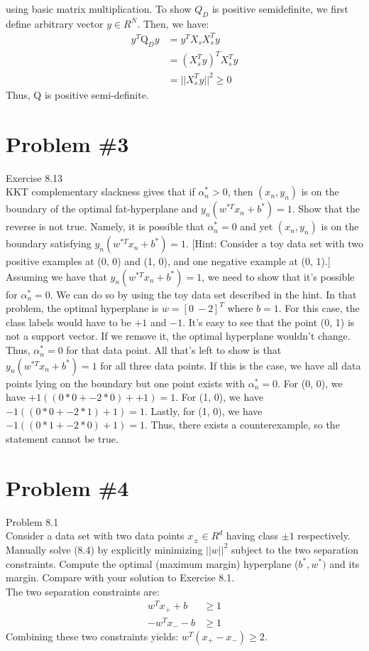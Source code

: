 \documentclass[12pt]{article}
\begin{document}
	using basic matrix multiplication.
	To show $Q_D$ is positive semidefinite, we first define arbitrary vector $y \in R^N$. Then, we have:
	\begin{align*}
		y^T \text{Q}_D y &= y^T X_sX_s^Ty \\
		&= (X_s^Ty)^T X_s^Ty\\
		&= ||X_s^Ty||^2 \ge 0
	\end{align*}
	Thus, Q is positive semi-definite.
	\section*{Problem \#3}
	Exercise 8.13 \\
	KKT complementary slackness gives that if $\alpha_n^* > 0$, then $(x_n , y_n)$ is on
	the boundary of the optimal fat-hyperplane and $y_n (w^{*T} x_n + b^{*} ) = 1$.
	Show that the reverse is not true. Namely, it is possible that $\alpha_n^* = 0$ and
	yet $(x_n , y_n)$ is on the boundary satisfying $y_n (w^{*T} x_n + b^{*} ) = 1$.
	[Hint: Consider a toy data set with two positive examples at (0, 0) and
	(1, 0), and one negative example at (0, 1).] \\
	Assuming we have that $y_n (w^{*T} x_n + b^{*} ) = 1$, we need to show that it's possible for $\alpha_n^* = 0$. We can do so by using the toy data set described in the hint. In that problem, the optimal hyperplane is $w = [0 \ -2]^T$ where $b=1$. For this case, the class labels would have to be $+1$ and $-1$. It's easy to see that the point (0, 1) is not a support vector. If we remove it, the optimal hyperplane wouldn't change. Thus, $\alpha_n^* = 0$ for that data point. All that's left to show is that $y_n (w^{*T} x_n + b^{*} ) = 1$ for all three data points. If this is the case, we have all data points lying on the boundary but one point exists with $\alpha_n^* = 0$. For (0, 0), we have $+1 ((0*0 + -2*0) + +1)=1$. For (1, 0), we have $-1 ((0*0 + -2*1) + 1)=1$. Lastly, for (1, 0), we have $-1 ((0*1 + -2*0) + 1)=1$. Thus, there exists a counterexample, so the statement cannot be true.
	\section*{Problem \#4}
	Problem 8.1 \\
	Consider a data set with two data points $x_{\pm} \in R^d$ having class $\pm1$ respectively. Manually solve (8.4) by explicitly minimizing $||w||^2$
	subject to the two separation constraints.
	Compute the optimal (maximum margin) hyperplane ($b^* , w^* )$ and its margin.
	Compare with your solution to Exercise 8.1. \\
	The two separation constraints are:
	\begin{align*}
		w^Tx_+ + b &\ge 1 \\
		-w^Tx_- -b &\ge 1  
	\end{align*}
	Combining these two constraints yields: $w^T(x_+ - x_-) \ge 2$.
\end{document}
